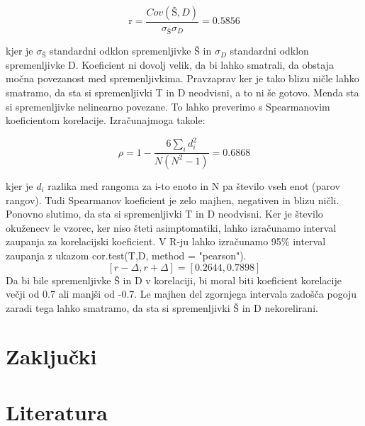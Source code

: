 \documentclass[a4paper,11pt]{article}
\begin{document}
\begin{center}
\[\text{r} = \frac{Cov(Š,D)}{\sigma_{Š} \sigma_{D}} = 0.5856\]
\end{center} 
kjer je \(\sigma_{Š}\) standardni odklon spremenljivke Š in \(\sigma_{D}\) standardni odklon spremenljivke D. Koeficient ni dovolj velik, da bi lahko smatrali, da obstaja močna povezanost med spremenljivkima. Pravzaprav ker je tako blizu ničle lahko smatramo, da sta si spremenljivki T in D neodvisni, a to ni še gotovo. Menda sta si spremenljivke nelinearno povezane. To lahko preverimo s Spearmanovim koeficientom korelacije. Izračunajmoga takole: 

\begin{center}
\[\rho = 1 - \frac{6\sum_{i}{}d_i^2}{N(N^2 - 1)} = 0.6868\]
\end{center} 

kjer je \( d_i \) razlika med rangoma za i-to enoto in N pa število vseh enot (parov rangov). Tudi Spearmanov koeficient je zelo majhen, negativen in blizu ničli. Ponovno slutimo, da sta si spremenljivki T in D neodvisni.
Ker je število okuženecv le vzorec, ker niso šteti asimptomatiki, lahko izračunamo interval zaupanja za korelacijski koeficient. V R-ju lahko izračunamo 95\% interval zaupanja z ukazom cor.test(T,D, method = "pearson").
\[[r - \Delta, r + \Delta] = [0.2644, 0.7898]\]
Da bi bile spremenljivke Š in D v korelaciji, bi moral biti koeficient korelacije večji od 0.7 ali manjši od -0.7. Le majhen del zgornjega intervala zadošča pogoju zaradi tega lahko smatramo, da sta si spremenljivki Š in D nekorelirani.

\section{Zaključki}


\section{Literatura}
\end{document}
